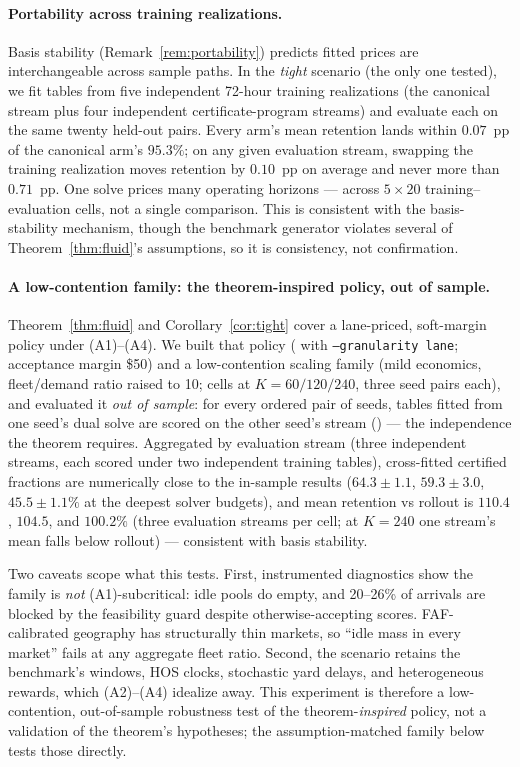 \documentclass[11pt]{article}
\begin{document}
\paragraph{Portability across training realizations.} Basis
stability (Remark~\ref{rem:portability}) predicts fitted prices are
interchangeable across sample paths. In the \emph{tight} scenario
(the only one tested), we fit tables from five
independent 72-hour training realizations (the canonical stream plus
four independent certificate-program streams) and evaluate each on the
same twenty held-out pairs. Every arm's mean retention lands within
$0.07$~pp of the canonical arm's $95.3\%$; on any given evaluation
stream, swapping the training realization moves retention by
$0.10$~pp on average and never more than $0.71$~pp. One solve prices
many operating horizons --- across $5 \times 20$
training--evaluation cells, not a single comparison. This is
consistent with the basis-stability mechanism, though the benchmark
generator violates several of Theorem~\ref{thm:fluid}'s assumptions,
so it is consistency, not confirmation.

\paragraph{A low-contention family: the theorem-inspired policy, out
of sample.} Theorem~\ref{thm:fluid}
and Corollary~\ref{cor:tight} cover a lane-priced, soft-margin policy
under (A1)--(A4). We built that policy
( with \texttt{--granularity lane};
acceptance margin \$50) and a low-contention scaling family (mild
economics, fleet/demand
ratio raised to 10; cells at $K = 60/120/240$, three seed pairs each),
and evaluated it \emph{out of sample}: for every ordered pair of
seeds, tables fitted from one seed's dual solve are scored on the
other seed's stream () ---
the independence the theorem requires. Aggregated by evaluation
stream (three independent streams, each scored under two independent
training tables), cross-fitted certified fractions are numerically
close to the in-sample results
($64.3 \pm 1.1$, $59.3 \pm 3.0$, $45.5 \pm 1.1\%$ at the deepest
solver budgets), and mean retention vs rollout is $110.4$, $104.5$,
and $100.2\%$ (three evaluation streams per cell; at $K = 240$ one
stream's mean falls below rollout) --- consistent with basis
stability.

Two caveats scope what this tests. First, instrumented diagnostics
show the family is \emph{not} (A1)-subcritical: idle pools do empty,
and 20--26\% of arrivals are blocked by the feasibility guard despite
otherwise-accepting scores. FAF-calibrated geography has structurally
thin markets, so ``idle mass in every market'' fails at any aggregate
fleet ratio. Second, the scenario retains the benchmark's windows,
HOS clocks, stochastic yard delays, and heterogeneous rewards, which
(A2)--(A4) idealize away. This experiment is therefore a
low-contention, out-of-sample robustness test of the
theorem-\emph{inspired} policy, not a validation of the theorem's
hypotheses; the assumption-matched family below tests those
directly.
\end{document}
